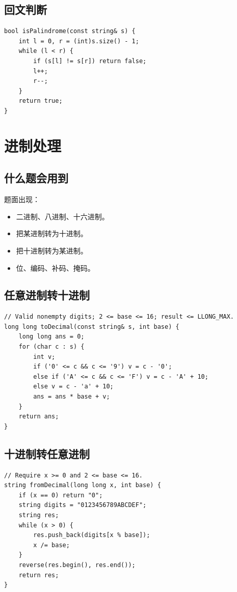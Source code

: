 \subsection{回文判断}

\begin{lstlisting}
bool isPalindrome(const string& s) {
    int l = 0, r = (int)s.size() - 1;
    while (l < r) {
        if (s[l] != s[r]) return false;
        l++;
        r--;
    }
    return true;
}
\end{lstlisting}

\section{进制处理}\label{sec:05-13}

\subsection{什么题会用到}

题面出现：

\begin{itemize}
  \item 二进制、八进制、十六进制。
  \item 把某进制转为十进制。
  \item 把十进制转为某进制。
  \item 位、编码、补码、掩码。
\end{itemize}

\subsection{任意进制转十进制}

\begin{lstlisting}
// Valid nonempty digits; 2 <= base <= 16; result <= LLONG_MAX.
long long toDecimal(const string& s, int base) {
    long long ans = 0;
    for (char c : s) {
        int v;
        if ('0' <= c && c <= '9') v = c - '0';
        else if ('A' <= c && c <= 'F') v = c - 'A' + 10;
        else v = c - 'a' + 10;
        ans = ans * base + v;
    }
    return ans;
}
\end{lstlisting}

\subsection{十进制转任意进制}

\begin{lstlisting}
// Require x >= 0 and 2 <= base <= 16.
string fromDecimal(long long x, int base) {
    if (x == 0) return "0";
    string digits = "0123456789ABCDEF";
    string res;
    while (x > 0) {
        res.push_back(digits[x % base]);
        x /= base;
    }
    reverse(res.begin(), res.end());
    return res;
}
\end{lstlisting}

